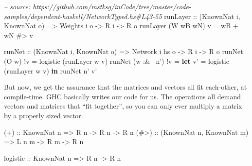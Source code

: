 \documentclass[]{article}
\newenvironment{Shaded}{}{}
\newcommand{\KeywordTok}[1]{\textcolor[rgb]{0.00,0.44,0.13}{\textbf{{#1}}}}
\newcommand{\DataTypeTok}[1]{\textcolor[rgb]{0.56,0.13,0.00}{{#1}}}
\newcommand{\CommentTok}[1]{\textcolor[rgb]{0.38,0.63,0.69}{\textit{{#1}}}}
\newcommand{\OtherTok}[1]{\textcolor[rgb]{0.00,0.44,0.13}{{#1}}}
\newcommand{\FunctionTok}[1]{\textcolor[rgb]{0.02,0.16,0.49}{{#1}}}
\newcommand{\NormalTok}[1]{{#1}}
\begin{document}
\begin{Shaded}
\begin{Highlighting}[]
\CommentTok{-- source: https://github.com/mstksg/inCode/tree/master/code-samples/dependent-haskell/NetworkTyped.hs#L43-55}
\OtherTok{runLayer ::} \NormalTok{(}\DataTypeTok{KnownNat} \NormalTok{i, }\DataTypeTok{KnownNat} \NormalTok{o)}
         \OtherTok{=>} \DataTypeTok{Weights} \NormalTok{i o}
         \OtherTok{->} \DataTypeTok{R} \NormalTok{i}
         \OtherTok{->} \DataTypeTok{R} \NormalTok{o}
\NormalTok{runLayer (}\DataTypeTok{W} \NormalTok{wB wN) v }\FunctionTok{=} \NormalTok{wB }\FunctionTok{+} \NormalTok{wN }\FunctionTok{#>} \NormalTok{v}

\OtherTok{runNet ::} \NormalTok{(}\DataTypeTok{KnownNat} \NormalTok{i, }\DataTypeTok{KnownNat} \NormalTok{o)}
       \OtherTok{=>} \DataTypeTok{Network} \NormalTok{i hs o}
       \OtherTok{->} \DataTypeTok{R} \NormalTok{i}
       \OtherTok{->} \DataTypeTok{R} \NormalTok{o}
\NormalTok{runNet (}\DataTypeTok{O} \NormalTok{w)      }\FunctionTok{!}\NormalTok{v }\FunctionTok{=} \NormalTok{logistic (runLayer w v)}
\NormalTok{runNet (w }\FunctionTok{:&~} \NormalTok{n') }\FunctionTok{!}\NormalTok{v }\FunctionTok{=} \KeywordTok{let} \NormalTok{v' }\FunctionTok{=} \NormalTok{logistic (runLayer w v)}
                       \KeywordTok{in}  \NormalTok{runNet n' v'}
\end{Highlighting}
\end{Shaded}

But now, we get the assurance that the matrices and vectors all fit
each-other, at compile-time. GHC basically writes our code for us. The
operations all demand vectors and matrices that ``fit together'', so you
can only ever multiply a matrix by a properly sized vector.

\begin{Shaded}
\begin{Highlighting}[]
\OtherTok{(+)  ::} \DataTypeTok{KnownNat} \NormalTok{n}
     \OtherTok{=>} \DataTypeTok{R} \NormalTok{n }\OtherTok{->} \DataTypeTok{R} \NormalTok{n }\OtherTok{->} \DataTypeTok{R} \NormalTok{n}
\OtherTok{(#>) ::} \NormalTok{(}\DataTypeTok{KnownNat} \NormalTok{n, }\DataTypeTok{KnownNat} \NormalTok{m)}
     \OtherTok{=>} \DataTypeTok{L} \NormalTok{n m }\OtherTok{->} \DataTypeTok{R} \NormalTok{m }\OtherTok{->} \DataTypeTok{R} \NormalTok{n}

\OtherTok{logistic ::} \DataTypeTok{KnownNat} \NormalTok{n}
         \OtherTok{=>} \DataTypeTok{R} \NormalTok{n }\OtherTok{->} \DataTypeTok{R} \NormalTok{n}
\end{Highlighting}
\end{Shaded}
\end{document}
